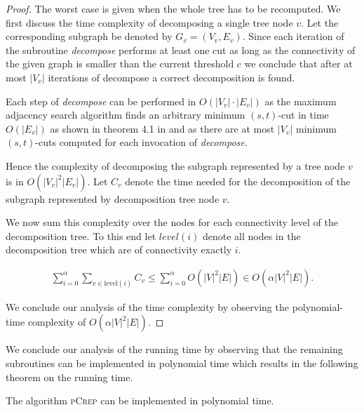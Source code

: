 \documentclass[a4paper,UKenglish,cleveref, autoref, thm-restate,authorcolumns]{../lipics/lipics-v2019}
\newcommand{\adjDel}{\textsc{pCrep}}
\begin{document}
\begin{proof}
	The worst case is given when the whole tree has to be recomputed. We first discuss the time complexity of decomposing a single tree node $v$. Let the corresponding subgraph be denoted by $G_v=(V_v, E_v)$.
	Since each iteration of the subroutine \textit{decompose} performs at least one cut as long as the connectivity of the given graph is smaller than the current threshold $c$ we conclude that after at most $|V_v|$ iterations of decompose a correct decomposition is found. 
	
	Each step of \textit{decompose} can be performed in $O(|V_v|\cdot|E_v|)$ as the maximum adjacency search algorithm finds an arbitrary minimum $(s,t)$-cut in time $O(|E_v|)$ as shown in theorem 4.1 in \cite{Chang2013} and as there are at most $|V_v|$ minimum $(s,t)$-cuts computed for each invocation of \textit{decompose}.
	
	Hence the complexity of decomposing the subgraph represented by a tree node $v$ is in $O(|V_v|^2|E_v|)$. Let $C_v$ denote the time needed for the decomposition of the subgraph represented  by decomposition tree node $v$.
	
	We now sum this complexity over the nodes for each connectivity level of the decomposition tree. To this end let $level(i)$ denote all nodes in the decomposition tree which are of connectivity exactly $i$.
	
	\begin{align*}
	\sum_{i=0}^{\alpha}\sum_{v\in \text{level}(i)}C_v\leq\sum_{i=0}^{\alpha}O(|V|^2|E|)\in O(\alpha|V|^2|E|).
	\end{align*}
	
	We conclude our analysis of the time complexity by observing the polynomial-time complexity of $O(\alpha|V|^2|E|)$.
\end{proof}


We conclude our analysis of the running time by observing that the remaining subroutines can be implemented in polynomial time which results in the following theorem on the running time.

\begin{theorem}
	\label{run_time_theo}
	The algorithm \adjDel{} can be implemented in polynomial time.
\end{theorem}
\end{document}

